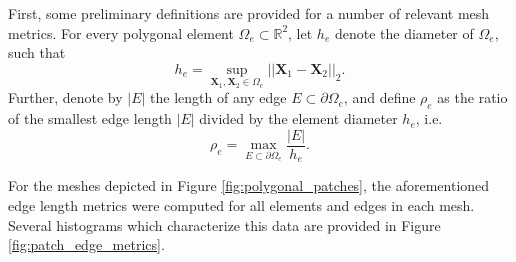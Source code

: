 First, some preliminary definitions are provided for a number of relevant mesh metrics. For every polygonal element $\Omega_e \subset \mathbb{R}^2$, let $h_e$ denote the diameter of $\Omega_e$, such that
\begin{equation}
	h_e = \sup_{\mathbf{X}_1, \mathbf{X}_2 \in \Omega_e} || \mathbf{X}_1 - \mathbf{X}_2 ||_2.
\end{equation}
Further, denote by $|E|$ the length of any edge $E \subset \partial \Omega_e$, and define $\rho_e$ as the ratio of the smallest edge length $|E|$ divided by the element diameter $h_e$, i.e.
\begin{equation}
	\rho_e = \max_{E \subset \partial \Omega_e} \frac{|E|}{h_e}.
\end{equation}

For the meshes depicted in Figure \ref{fig:polygonal_patches}, the aforementioned edge length metrics were computed for all elements and edges in each mesh. Several histograms which characterize this data are provided in Figure \ref{fig:patch_edge_metrics}.
